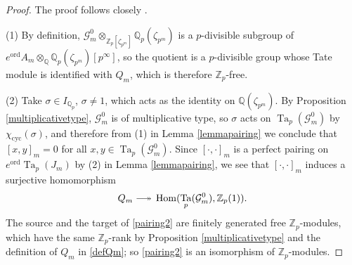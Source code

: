 \documentclass[a4paper,11pt]{amsart}
\numberwithin{equation}{section}
\theoremstyle{plain}
\theoremstyle{definition}
\theoremstyle{remark}
\newcommand{\Q}{\mathbb{Q}}
\newcommand{\Z}{\mathbb{Z}}
\DeclareMathOperator{\Hom}{Hom}
\DeclareMathOperator{\Ta}{Ta}
\newcommand{\cyc}{{\mathrm{cyc}}}
\newcommand{\ord}{\mathrm{ord}}
\newcommand{\longepi}{\mbox{\;$\relbar\joinrel\twoheadrightarrow$\;}}
\begin{document}
\begin{proof}
The proof follows closely \cite[Proposition (1.2.8)]{OhtaMA}. 

(1) By definition, $\mathcal{G}^0_m\otimes_{\Z_p[\zeta_{p^m}]}\Q_p(\zeta_{p^m})$ is a $p$-divisible subgroup of $e^\ord A_m\otimes_\Q\Q_p(\zeta_{p^m})[p^\infty]$, so the quotient is a $p$-divisible group whose Tate module is identified with $Q_m$, which is therefore $\Z_p$-free. 

(2) Take $\sigma\in I_{\Q_p}$, $\sigma\neq1$, which acts as the identity on $\Q(\zeta_{p^m})$. By Proposition 
\ref{multiplicativetype}, $\mathcal{G}_m^0$ is of multiplicative type, so $\sigma$ acts on $\Ta_p(\mathcal{G}_m^0)$ by $\chi_\cyc(\sigma)$, and therefore from (1) in Lemma \ref{lemmapairing} we conclude that $[x,y]_m=0$ for all $x,y\in \Ta_p(\mathcal{G}_m^0)$. Since $[\cdot,\cdot]_m$ is a perfect pairing on $e^\ord\Ta_p(J_m)$ by (2) in Lemma \ref{lemmapairing}, we see that $[\cdot,\cdot]_m$ induces a surjective homomorphism 
\begin{equation}\label{pairing2}
Q_m\longepi \Hom(\Ta_p(\mathcal{G}_m^0),\Z_p(1)).\end{equation}
The source and the target of \eqref{pairing2} are finitely generated free $\Z_p$-modules, which have the same $\Z_p$-rank by Proposition \ref{multiplicativetype} and the definition of $Q_m$ in \eqref{defQm}; so \eqref{pairing2} is an isomorphism of $\Z_p$-modules. 


\end{proof}
\end{document}
